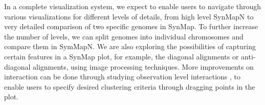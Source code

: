 \documentclass{vgtc}                      %
\begin{document}


  
In a complete visualization system, we expect to enable users to navigate through various visualizations for different levels of details, from high level SynMapN to very detailed comparison of two specific genomes in SynMap. To further increase the number of levels, we can split genomes into individual chromosomes and compare them in SymMapN. We are also exploring the possibilities of capturing certain features in a SynMap plot, for example, the diagonal alignments or anti-diagonal alignments, using image processing techniques. More improvements on interaction can be done through studying observation level interactions \cite{endert2011observation}, to enable users to specify desired clustering criteria through dragging points in the plot. 






%
%
%
%


\end{document}
